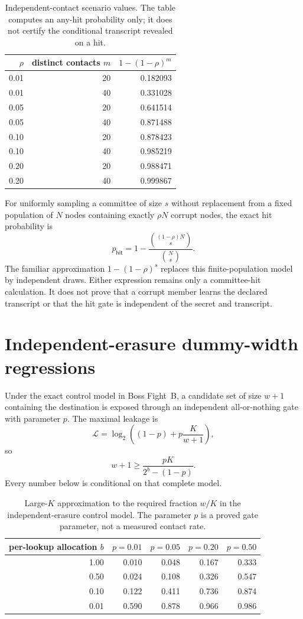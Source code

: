 \documentclass[11pt]{article}
\newcommand{\MaxL}{\mathcal{L}}
\newcommand{\logtwo}{\log_2}
\begin{document}
\begin{table}[H]
\centering
\small
\begin{tabular}{@{}r r r@{}}
\toprule
\(\rho\) & distinct contacts \(m\) & \(1-(1-\rho)^m\)\\
\midrule
0.01 & 20 & 0.182093\\
0.01 & 40 & 0.331028\\
0.05 & 20 & 0.641514\\
0.05 & 40 & 0.871488\\
0.10 & 20 & 0.878423\\
0.10 & 40 & 0.985219\\
0.20 & 20 & 0.988471\\
0.20 & 40 & 0.999867\\
\bottomrule
\end{tabular}
\caption{Independent-contact scenario values. The table computes an any-hit probability only; it does not certify the conditional transcript revealed on a hit.}
\label{tab:independent-contact-sweep}
\end{table}

For uniformly sampling a committee of size \(s\) without replacement from a fixed population of \(N\) nodes containing exactly \(\rho N\) corrupt nodes, the exact hit probability is
\[
p_{\mathsf{hit}}
=1-\frac{\binom{(1-\rho)N}{s}}{\binom{N}{s}}.
\]
The familiar approximation \(1-(1-\rho)^s\) replaces this finite-population model by independent draws. Either expression remains only a committee-hit calculation. It does not prove that a corrupt member learns the declared transcript or that the hit gate is independent of the secret and transcript.

\section{Independent-erasure dummy-width regressions}\label{sec:dummy}
Under the exact control model in Boss Fight~B, a candidate set of size \(w+1\) containing the destination is exposed through an independent all-or-nothing gate with parameter \(p\). The maximal leakage is
\[
\MaxL=\logtwo\!\left((1-p)+p\frac{K}{w+1}\right),
\]
so
\[
w+1\ge\frac{pK}{2^b-(1-p)}.
\]
Every number below is conditional on that complete model.

\begin{table}[H]
\centering
\small
\begin{tabular}{@{}r r r r r@{}}
\toprule
per-lookup allocation \(b\) & \(p=0.01\) & \(p=0.05\) & \(p=0.20\) & \(p=0.50\)\\
\midrule
1.00 & 0.010 & 0.048 & 0.167 & 0.333\\
0.50 & 0.024 & 0.108 & 0.326 & 0.547\\
0.10 & 0.122 & 0.411 & 0.736 & 0.874\\
0.01 & 0.590 & 0.878 & 0.966 & 0.986\\
\bottomrule
\end{tabular}
\caption{Large-\(K\) approximation to the required fraction \(w/K\) in the independent-erasure control model. The parameter \(p\) is a proved gate parameter, not a measured contact rate.}
\label{tab:dummy-fraction}
\end{table}
\end{document}
